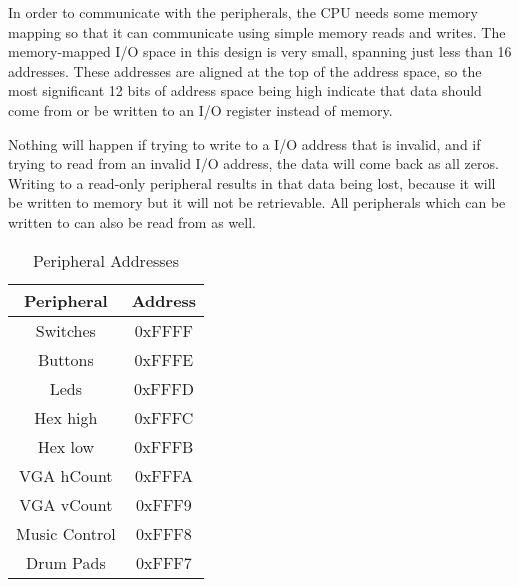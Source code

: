 \documentclass{subfile}
\begin{document}
  In order to communicate with the peripherals, the CPU needs some memory mapping so that it 
  can communicate using simple memory reads and writes.
  The memory-mapped I/O space in this design is very small, spanning just less than 16 addresses. 
  These addresses are aligned at the top of the address space, so the most significant 
  12 bits of address space being high indicate that data should come from or be 
  written to an I/O register instead of memory.

  Nothing will happen if trying to write to a I/O address that is invalid, and if trying to 
  read from an invalid I/O address, the data will come back as all zeros.
  Writing to a read-only peripheral results in that data being lost, because it will be 
  written to memory but it will not be retrievable. 
  All peripherals which can be written to can also be read from as well.

  \begin{table}[h]
    \caption{Peripheral Addresses} 
    \label{tab:addrs}
    \centering
    \begin{tabular}{|c|c|}
      \hline 
      Peripheral & Address \\ \hline
      \hline
      Switches & 0xFFFF \\ \hline 
      Buttons & 0xFFFE \\ \hline 
      Leds    & 0xFFFD \\ \hline 
      Hex high & 0xFFFC \\ \hline 
      Hex low & 0xFFFB \\ \hline 
      VGA hCount & 0xFFFA \\ \hline 
      VGA vCount & 0xFFF9 \\ \hline 
      Music Control & 0xFFF8 \\ \hline 
      Drum Pads & 0xFFF7 \\ \hline 
    \end{tabular}
  \end{table}
  
\end{document}
